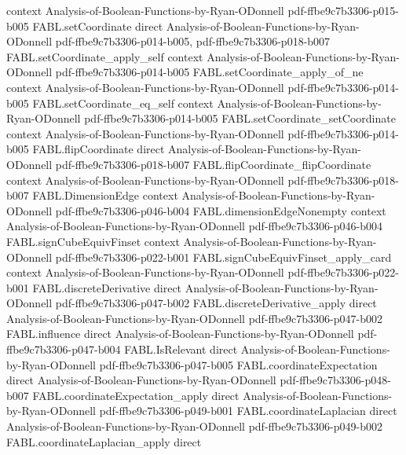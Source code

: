 \begin{theorem}
  {context}
  {Analysis-of-Boolean-Functions-by-Ryan-ODonnell}
  {pdf-ffbe9c7b3306-p015-b005}
\proofstep
  {FABL.setCoordinate}
  {direct}
  {Analysis-of-Boolean-Functions-by-Ryan-ODonnell}
  {pdf-ffbe9c7b3306-p014-b005,
    pdf-ffbe9c7b3306-p018-b007}
\proofstep
  {FABL.setCoordinate_apply_self}
  {context}
  {Analysis-of-Boolean-Functions-by-Ryan-ODonnell}
  {pdf-ffbe9c7b3306-p014-b005}
\proofstep
  {FABL.setCoordinate_apply_of_ne}
  {context}
  {Analysis-of-Boolean-Functions-by-Ryan-ODonnell}
  {pdf-ffbe9c7b3306-p014-b005}
\proofstep
  {FABL.setCoordinate_eq_self}
  {context}
  {Analysis-of-Boolean-Functions-by-Ryan-ODonnell}
  {pdf-ffbe9c7b3306-p014-b005}
\proofstep
  {FABL.setCoordinate_setCoordinate}
  {context}
  {Analysis-of-Boolean-Functions-by-Ryan-ODonnell}
  {pdf-ffbe9c7b3306-p014-b005}
\proofstep
  {FABL.flipCoordinate}
  {direct}
  {Analysis-of-Boolean-Functions-by-Ryan-ODonnell}
  {pdf-ffbe9c7b3306-p018-b007}
\proofstep
  {FABL.flipCoordinate_flipCoordinate}
  {context}
  {Analysis-of-Boolean-Functions-by-Ryan-ODonnell}
  {pdf-ffbe9c7b3306-p018-b007}
\proofstep
  {FABL.DimensionEdge}
  {context}
  {Analysis-of-Boolean-Functions-by-Ryan-ODonnell}
  {pdf-ffbe9c7b3306-p046-b004}
\proofstep
  {FABL.dimensionEdgeNonempty}
  {context}
  {Analysis-of-Boolean-Functions-by-Ryan-ODonnell}
  {pdf-ffbe9c7b3306-p046-b004}
\proofstep
  {FABL.signCubeEquivFinset}
  {context}
  {Analysis-of-Boolean-Functions-by-Ryan-ODonnell}
  {pdf-ffbe9c7b3306-p022-b001}
\proofstep
  {FABL.signCubeEquivFinset_apply_card}
  {context}
  {Analysis-of-Boolean-Functions-by-Ryan-ODonnell}
  {pdf-ffbe9c7b3306-p022-b001}
\proofstep
  {FABL.discreteDerivative}
  {direct}
  {Analysis-of-Boolean-Functions-by-Ryan-ODonnell}
  {pdf-ffbe9c7b3306-p047-b002}
\proofstep
  {FABL.discreteDerivative_apply}
  {direct}
  {Analysis-of-Boolean-Functions-by-Ryan-ODonnell}
  {pdf-ffbe9c7b3306-p047-b002}
\proofstep
  {FABL.influence}
  {direct}
  {Analysis-of-Boolean-Functions-by-Ryan-ODonnell}
  {pdf-ffbe9c7b3306-p047-b004}
\proofstep
  {FABL.IsRelevant}
  {direct}
  {Analysis-of-Boolean-Functions-by-Ryan-ODonnell}
  {pdf-ffbe9c7b3306-p047-b005}
\proofstep
  {FABL.coordinateExpectation}
  {direct}
  {Analysis-of-Boolean-Functions-by-Ryan-ODonnell}
  {pdf-ffbe9c7b3306-p048-b007}
\proofstep
  {FABL.coordinateExpectation_apply}
  {direct}
  {Analysis-of-Boolean-Functions-by-Ryan-ODonnell}
  {pdf-ffbe9c7b3306-p049-b001}
\proofstep
  {FABL.coordinateLaplacian}
  {direct}
  {Analysis-of-Boolean-Functions-by-Ryan-ODonnell}
  {pdf-ffbe9c7b3306-p049-b002}
\proofstep
  {FABL.coordinateLaplacian_apply}
  {direct}

\end{theorem}

